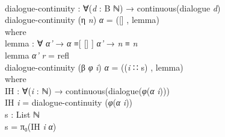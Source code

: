 \documentclass{entcs} \usepackage{prentcsmacro}
\newcommand{\AgdaFontStyle}[1]{\textsf{#1}}
\newcommand{\AgdaBoundFontStyle}[1]{\textit{#1}}
\newcommand{\AgdaKeyword}     [1]
    {\AgdaFontStyle{\textcolor{AgdaKeyword}{#1}}}
\newcommand{\AgdaSymbol}      [1]{\textcolor{AgdaSymbol}{#1}}
\newcommand{\AgdaBound}    [1]{\AgdaBoundFontStyle{\textcolor{AgdaBound}{#1}}}
\newcommand{\AgdaInductiveConstructor}[1]
    {\AgdaFontStyle{\textcolor{AgdaInductiveConstructor}{#1}}}
\newcommand{\AgdaDatatype} [1]{\AgdaFontStyle{\textcolor{AgdaDatatype}{#1}}}
\newcommand{\AgdaFunction} [1]{\AgdaFontStyle{\textcolor{AgdaFunction}{#1}}}
\newcommand{\AgdaIndent}[1]{\quad}
\newcommand{\AgdaCodeStyle}{\small}
\newenvironment{code}%
{\noindent\AgdaCodeStyle\pboxed}%
{\endpboxed\par\noindent%
\ignorespacesafterend}
\begin{document}
\begin{code}\>\<%
\\
\>\AgdaFunction{dialogue-continuity} \AgdaSymbol{:} \AgdaSymbol{∀(}\AgdaBound{d} \AgdaSymbol{:} \AgdaFunction{B} \AgdaDatatype{ℕ}\AgdaSymbol{)} \AgdaSymbol{→} \AgdaFunction{continuous}\AgdaSymbol{(}\AgdaFunction{dialogue} \AgdaBound{d}\AgdaSymbol{)}\<%
\\
\>\AgdaFunction{dialogue-continuity} \AgdaSymbol{(}\AgdaInductiveConstructor{η} \AgdaBound{n}\AgdaSymbol{)} \AgdaBound{α} \AgdaSymbol{=} \AgdaSymbol{(}\AgdaInductiveConstructor{[]} \AgdaInductiveConstructor{,} \AgdaFunction{lemma}\AgdaSymbol{)}\<%
\\
\>[0]\AgdaIndent{2}{}\<[2]%
\>[2]\AgdaKeyword{where}\<%
\\
\>[2]\AgdaIndent{4}{}\<[4]%
\>[4]\AgdaFunction{lemma} \AgdaSymbol{:} \AgdaSymbol{∀} \AgdaBound{α'} \AgdaSymbol{→} \AgdaBound{α} \AgdaDatatype{≡[} \AgdaInductiveConstructor{[]} \AgdaDatatype{]} \AgdaBound{α'} \AgdaSymbol{→} \AgdaBound{n} \AgdaDatatype{≡} \AgdaBound{n} \<[40]%
\>[40]\<%
\\
\>[2]\AgdaIndent{4}{}\<[4]%
\>[4]\AgdaFunction{lemma} \AgdaBound{α'} \AgdaBound{r} \AgdaSymbol{=} \AgdaInductiveConstructor{refl}\<%
\\
\>\AgdaFunction{dialogue-continuity} \AgdaSymbol{(}\AgdaInductiveConstructor{β} \AgdaBound{φ} \AgdaBound{i}\AgdaSymbol{)} \AgdaBound{α} \AgdaSymbol{=} \AgdaSymbol{((}\AgdaBound{i} \AgdaInductiveConstructor{∷} \AgdaFunction{s}\AgdaSymbol{)} \AgdaInductiveConstructor{,} \AgdaFunction{lemma}\AgdaSymbol{)} \<[50]%
\>[50]\<%
\\
\>[0]\AgdaIndent{2}{}\<[2]%
\>[2]\AgdaKeyword{where}\<%
\\
\>[0]\AgdaIndent{4}{}\<[4]%
\>[4]\AgdaFunction{IH} \AgdaSymbol{:} \AgdaSymbol{∀(}\AgdaBound{i} \AgdaSymbol{:} \AgdaDatatype{ℕ}\AgdaSymbol{)} \AgdaSymbol{→} \AgdaFunction{continuous}\AgdaSymbol{(}\AgdaFunction{dialogue}\AgdaSymbol{(}\AgdaBound{φ}\AgdaSymbol{(}\AgdaBound{α} \AgdaBound{i}\AgdaSymbol{)))}\<%
\\
\>[0]\AgdaIndent{4}{}\<[4]%
\>[4]\AgdaFunction{IH} \AgdaBound{i} \AgdaSymbol{=} \AgdaFunction{dialogue-continuity} \AgdaSymbol{(}\AgdaBound{φ}\AgdaSymbol{(}\AgdaBound{α} \AgdaBound{i}\AgdaSymbol{))}\<%
\\
\>[0]\AgdaIndent{4}{}\<[4]%
\>[4]\AgdaFunction{s} \AgdaSymbol{:} \AgdaDatatype{List} \AgdaDatatype{ℕ}\<%
\\
\>[0]\AgdaIndent{4}{}\<[4]%
\>[4]\AgdaFunction{s} \AgdaSymbol{=} \AgdaFunction{π₀}\AgdaSymbol{(}\AgdaFunction{IH} \AgdaBound{i} \AgdaBound{α}\AgdaSymbol{)}\<%

\end{code}
\end{document}
